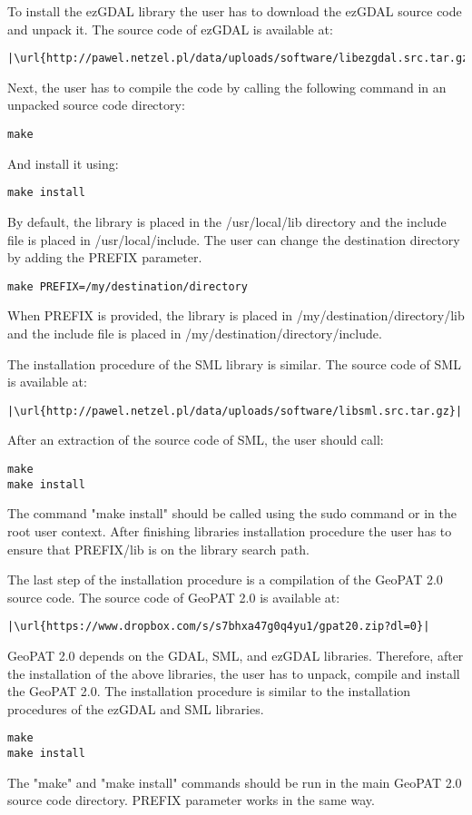 To install the ezGDAL library the user has to download the ezGDAL source code and unpack it.
The source code of ezGDAL is available at:
\begin{lstlisting}[escapechar=|]
|\url{http://pawel.netzel.pl/data/uploads/software/libezgdal.src.tar.gz}|
\end{lstlisting}
Next, the user has to compile the code by calling the following command in an unpacked source code directory:
\begin{lstlisting}
make
\end{lstlisting}
And install it using:
\begin{lstlisting}
make install
\end{lstlisting}
By default, the library is placed in the /usr/local/lib directory and the include file is placed in /usr/local/include.
The user can change the destination directory by adding the PREFIX parameter.
\begin{lstlisting}
make PREFIX=/my/destination/directory
\end{lstlisting}
When PREFIX is provided, the library is placed in /my/destination/directory/lib and the include file is placed in /my/destination/directory/include.

The installation procedure of the SML library is similar.
The source code of SML is available at:
\begin{lstlisting}[escapechar=|]
|\url{http://pawel.netzel.pl/data/uploads/software/libsml.src.tar.gz}|
\end{lstlisting}
After an extraction of the source code of SML, the user should call: 
\begin{lstlisting}
make
make install
\end{lstlisting}
The command "make install" should be called using the sudo command or in the root user context.
After finishing libraries installation procedure the user has to ensure that PREFIX/lib is on the library search path.

The last step of the installation procedure is a compilation of the GeoPAT 2.0 source code.
The source code of GeoPAT 2.0 is available at:
\begin{lstlisting}[escapechar=|]
|\url{https://www.dropbox.com/s/s7bhxa47g0q4yu1/gpat20.zip?dl=0}|
\end{lstlisting}
GeoPAT 2.0 depends on the GDAL, SML, and ezGDAL libraries.
Therefore, after the installation of the above libraries, the user has to unpack, compile and install the GeoPAT 2.0.
The installation procedure is similar to the installation procedures of the ezGDAL and SML libraries.
\begin{lstlisting}
make
make install
\end{lstlisting}
The "make" and "make install" commands should be run in the main GeoPAT 2.0 source code directory.
PREFIX parameter works in the same way.

